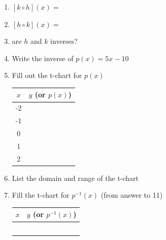 \documentclass[12pt]{article}
\begin{document}
\begin{enumerate}[resume]
	\setlength\itemsep{1cm}
	
	\item $[k\circ h](x)=$\\
	
	\item $[h \circ k](x)=$\\
	
	\item are $h$ and $k$ inverses?\\
	
	\item Write the inverse of $p(x)=5x-10$\\
	
		\vspace{1in}
		
	\item Fill out the t-chart for $p(x)$
	
	\begin{center}
	\begin{tabular}{c | c}
	
		\hspace{.5cm}$x$ \hspace{.5cm} & $y$ (or $p(x)$) \\ \hline
	
		-2 & \\
		 
		-1 & \\
		
		0 &  \\
		
		1 &  \\
		
		2 &  \\
	
	\end{tabular}
	\end{center}
	
	\item List the domain and range of the t-chart\\
	
	\item Fill the t-chart for $p^{-1}(x)$ (from answer to 11)\\
		\begin{center}
		\begin{tabular}{c | c}
	
		\hspace{.5cm}$x$ \hspace{.5cm} & $y$ (or $p^{-1}(x)$) \\ \hline
	
		& \\
		 
		& \\
		
		&  \\
		
		&  \\
		
		&  \\
	
	\end{tabular}
	\end{center}	
\end{enumerate}
\end{document}
